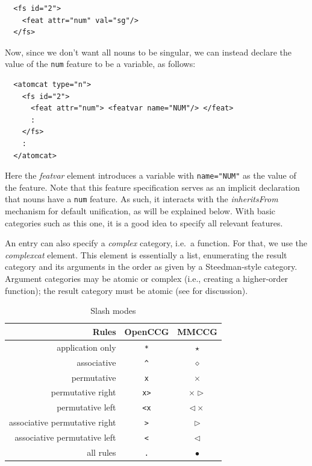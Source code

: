 \documentclass[11pt]{article}
\newcommand{\occg}{OpenCCG}
\begin{document}
\begin{verbatim}
  <fs id="2">
    <feat attr="num" val="sg"/>
  </fs>
\end{verbatim}

Now, since we don't want all nouns to be singular, we can instead
declare the value of the \texttt{num} feature to be a variable, as
follows:

\begin{verbatim}
  <atomcat type="n">
    <fs id="2">
      <feat attr="num"> <featvar name="NUM"/> </feat>
      :
    </fs>
    :
  </atomcat>
\end{verbatim}

\noindent Here the \textsl{featvar} element introduces a variable with
\texttt{name="NUM"} as the value of the feature. Note that this feature
specification serves as an implicit declaration that nouns have a
\texttt{num} feature. As such, it interacts with the
\textsl{inheritsFrom} mechanism for default unification, as will be
explained below. With basic categories such as this one, it is a good
idea to specify all relevant features.

An entry can also specify a \emph{complex} category, i.e.\ a function.
For that, we use the \textsl{complexcat} element. This element is
essentially a list, enumerating the result category and its arguments in
the order as given by a Steedman-style category. Argument categories may
be atomic or complex (i.e., creating a higher-order function); the
result category must be atomic (see \cite{Baldridge:2002} for
discussion).

\begin{table}
\begin{center}
\begin{tabular}{rcc}
Rules                          & \occg       & MMCCG \\ \hline
application only               & \texttt{*}  & $\star$ \\
associative                    & \verb+^+    & $\diamond$ \\
permutative                    & \texttt{x}  & $\times$ \\
permutative right              & \texttt{x>} & $\times\triangleright$\\
permutative left               & \texttt{<x} & $\triangleleft\times$\\
associative permutative right  & \texttt{>}  & $\triangleright$\\
associative permutative left   & \texttt{<}  & $\triangleleft$\\
all rules                      & \texttt{.}  & $\bullet$ \\  \hline %
\end{tabular}
\end{center}
\caption{Slash modes}
\label{slash-modes}
\end{table}
\end{document}
